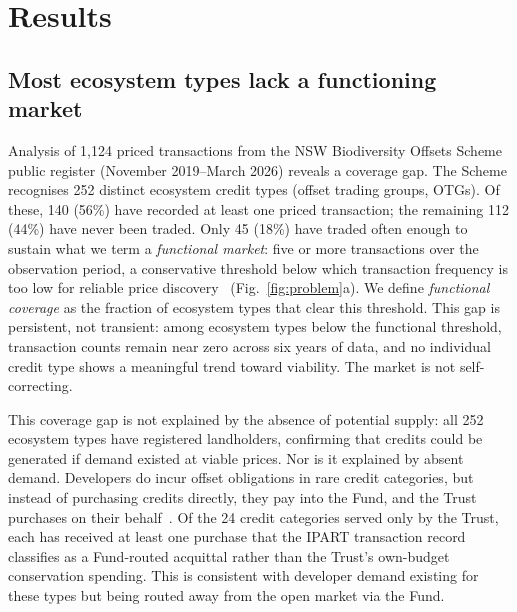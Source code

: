 \documentclass[pdflatex,sn-nature,oneside]{sn-jnl}
\begin{document}

\section{Results}\label{sec:results}

\subsection*{Most ecosystem types lack a functioning market}

Analysis of 1,124 priced transactions from the NSW Biodiversity Offsets Scheme
public register (November 2019--March 2026) reveals a coverage gap.
The Scheme recognises 252 distinct ecosystem credit types (offset trading groups,
OTGs).
Of these, 140 (56\%) have recorded at least one priced transaction;
the remaining 112 (44\%) have never been traded.
Only 45 (18\%) have traded often enough to sustain what we term a
\emph{functional market}: five or more transactions over the observation
period, a conservative threshold below which transaction frequency is too low
for reliable price discovery~\cite{Cont2001} (Fig.~\ref{fig:problem}a).
We define \emph{functional coverage} as the fraction of ecosystem types that
clear this threshold.
This gap is persistent, not transient: among ecosystem types below the
functional threshold, transaction counts remain near zero across six
years of data, and no individual credit type shows a meaningful trend
toward viability.
The market is not self-correcting.

This coverage gap is not explained by the absence of potential supply:
all 252 ecosystem types have registered landholders, confirming that
credits could be generated if demand existed at viable prices.
Nor is it explained by absent demand. Developers do incur offset
obligations in rare credit categories, but instead of purchasing credits
directly, they pay into the Fund, and the Trust purchases on their
behalf~\cite{IPART2024}. Of the 24 credit categories served only by the
Trust, each has received at least one purchase that the IPART transaction
record classifies as a Fund-routed acquittal rather than the Trust's
own-budget conservation spending. This is consistent with developer demand
existing for these types but being routed away from the open market via
the Fund.
\end{document}
